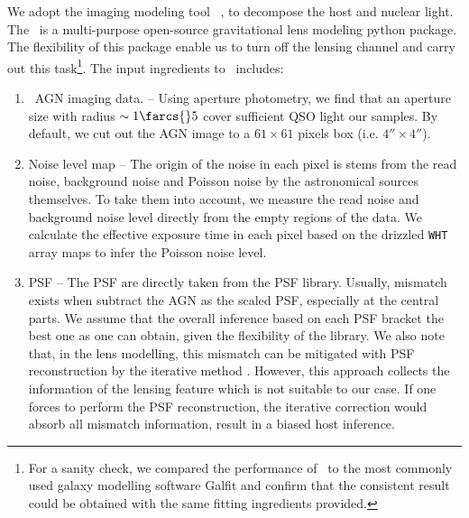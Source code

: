 \documentclass[apj]{emulateapj}
\begin{document}
We adopt the imaging modeling tool \lenstronomy\ \citep{lenstronomy}, to decompose the host and nuclear light. The \lenstronomy\ is a multi-purpose open-source gravitational lens modeling python package. 
The flexibility of this package enable us to turn off the lensing channel and carry out this task\footnote{For a sanity check, we compared the performance of \lenstronomy\ to the most commonly used galaxy modelling software {\sc Galfit} and confirm that the consistent result could be obtained with the same fitting ingredients provided.}. The input ingredients to \lenstronomy\ includes:
\begin{enumerate}
\item \hst\ AGN imaging data. -- Using aperture photometry, we find that an aperture size with radius $\sim1\farcs{}5$ cover sufficient QSO light our samples. By default, we cut out the AGN image to a $61\times61$ pixels box (i.e. $4''\times 4''$). 
\item Noise level map -- The origin of the noise in each pixel is stems from the read noise, background noise and Poisson noise by the astronomical sources themselves. To take them into account, we measure the read noise and background noise level directly from the empty regions of the data. We calculate the effective exposure time in each pixel based on the drizzled \texttt{WHT} array maps to infer the Poisson noise level. 
\item PSF -- The PSF are directly taken from the PSF library. Usually, mismatch exists when subtract the AGN as the scaled PSF, especially at the central parts. We assume that the overall inference based on each PSF bracket the best one as one can obtain, given the flexibility of the library. We also note that, in the lens modelling, this mismatch can be mitigated with PSF reconstruction by the iterative method \citep{Chen2016, Birrer2018}.  However, this approach collects the information of the lensing feature which is not suitable to our case. If one forces to perform the PSF reconstruction, the iterative correction would absorb all mismatch information, result in a biased host inference.
\end{enumerate}
\end{document}
